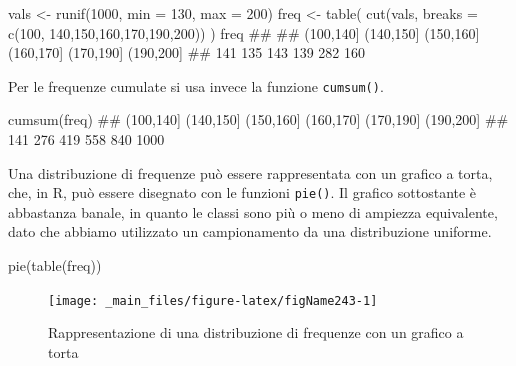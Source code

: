 \documentclass[a4paper,12pt,oneside]{book}
\newenvironment{Shaded}{\begin{snugshade}}{\end{snugshade}}
\newcommand{\DecValTok}[1]{#1}
\newcommand{\DocumentationTok}[1]{#1}
\newcommand{\OtherTok}[1]{#1}
\newcommand{\FunctionTok}[1]{#1}
\newcommand{\AttributeTok}[1]{#1}
\newcommand{\NormalTok}[1]{#1}
\begin{document}
\begin{Shaded}
\begin{Highlighting}[]
\NormalTok{vals }\OtherTok{\textless{}{-}} \FunctionTok{runif}\NormalTok{(}\DecValTok{1000}\NormalTok{, }\AttributeTok{min =} \DecValTok{130}\NormalTok{, }\AttributeTok{max =} \DecValTok{200}\NormalTok{)}
\NormalTok{freq }\OtherTok{\textless{}{-}} \FunctionTok{table}\NormalTok{( }\FunctionTok{cut}\NormalTok{(vals, }\AttributeTok{breaks =} \FunctionTok{c}\NormalTok{(}\DecValTok{100}\NormalTok{, }\DecValTok{140}\NormalTok{,}\DecValTok{150}\NormalTok{,}\DecValTok{160}\NormalTok{,}\DecValTok{170}\NormalTok{,}\DecValTok{190}\NormalTok{,}\DecValTok{200}\NormalTok{)) )}
\NormalTok{freq}
\DocumentationTok{\#\# }
\DocumentationTok{\#\# (100,140] (140,150] (150,160] (160,170] (170,190] (190,200] }
\DocumentationTok{\#\#       141       135       143       139       282       160}
\end{Highlighting}
\end{Shaded}

Per le frequenze cumulate si usa invece la funzione \texttt{cumsum()}.

\begin{Shaded}
\begin{Highlighting}[]
\FunctionTok{cumsum}\NormalTok{(freq)}
\DocumentationTok{\#\# (100,140] (140,150] (150,160] (160,170] (170,190] (190,200] }
\DocumentationTok{\#\#       141       276       419       558       840      1000}
\end{Highlighting}
\end{Shaded}

Una distribuzione di frequenze può essere rappresentata con un grafico a torta, che, in R, può essere disegnato con le funzioni \texttt{pie()}. Il grafico sottostante è abbastanza banale, in quanto le classi sono più o meno di ampiezza equivalente, dato che abbiamo utilizzato un campionamento da una distribuzione uniforme.

\begin{Shaded}
\begin{Highlighting}[]
\FunctionTok{pie}\NormalTok{(}\FunctionTok{table}\NormalTok{(freq))}
\end{Highlighting}
\end{Shaded}

\begin{figure}

{\centering \texttt{[image: \_main\_files/figure-latex/figName243-1]} 

}

\caption{Rappresentazione di una distribuzione di frequenze con un grafico a torta}\label{fig:figName243}
\end{figure}
\end{document}
